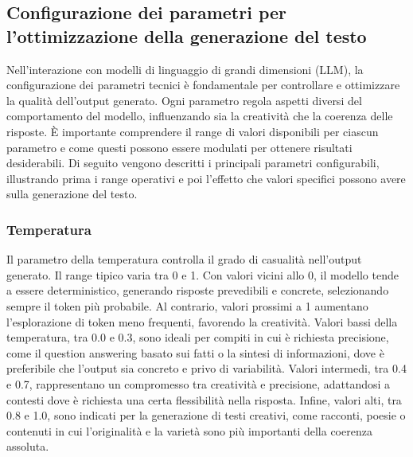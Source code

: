 \documentclass[target=mst,aauheader=,style=]{thud}
\begin{document}
\subsection{Configurazione dei parametri per l’ottimizzazione della generazione del testo}
Nell’interazione con modelli di linguaggio di grandi dimensioni (LLM), la configurazione dei parametri tecnici è fondamentale per controllare e ottimizzare la qualità dell’output generato. Ogni parametro regola aspetti diversi del comportamento del modello, influenzando sia la creatività che la coerenza delle risposte. È importante comprendere il range di valori disponibili per ciascun parametro e come questi possono essere modulati per ottenere risultati desiderabili. Di seguito vengono descritti i principali parametri configurabili, illustrando prima i range operativi e poi l’effetto che valori specifici possono avere sulla generazione del testo.\cite{zhao_2023}\cite{naveed_2024}

\subsubsection{Temperatura}
Il parametro della temperatura controlla il grado di casualità nell’output generato. Il range tipico varia tra 0 e 1. Con valori vicini allo 0, il modello tende a essere deterministico, generando risposte prevedibili e concrete, selezionando sempre il token più probabile. Al contrario, valori prossimi a 1 aumentano l’esplorazione di token meno frequenti, favorendo la creatività.
Valori bassi della temperatura, tra 0.0 e 0.3, sono ideali per compiti in cui è richiesta precisione, come il question answering basato sui fatti o la sintesi di informazioni, dove è preferibile che l’output sia concreto e privo di variabilità. Valori intermedi, tra 0.4 e 0.7, rappresentano un compromesso tra creatività e precisione, adattandosi a contesti dove è richiesta una certa flessibilità nella risposta. Infine, valori alti, tra 0.8 e 1.0, sono indicati per la generazione di testi creativi, come racconti, poesie o contenuti in cui l’originalità e la varietà sono più importanti della coerenza assoluta.
\end{document}
